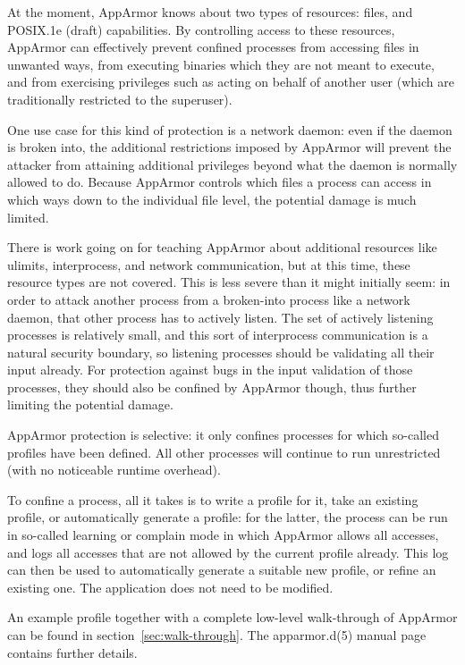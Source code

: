 \documentclass[a4paper]{article}
\begin{document}
At the moment, AppArmor knows about two types of resources: files, and
POSIX.1e (draft) capabilities.  By controlling access to these
resources, AppArmor can effectively prevent confined processes from
accessing files in unwanted ways, from executing binaries which they are
not meant to execute, and from exercising privileges such as acting on
behalf of another user (which are traditionally restricted to the
superuser).

One use case for this kind of protection is a network daemon: even if
the daemon is broken into, the additional restrictions imposed by
AppArmor will prevent the attacker from attaining additional privileges
beyond what the daemon is normally allowed to do.  Because AppArmor
controls which files a process can access in which ways down to the
individual file level, the potential damage is much limited.

There is work going on for teaching AppArmor about additional resources
like ulimits, interprocess, and network communication, but at this time,
these resource types are not covered.  This is less severe than it might
initially seem: in order to attack another process from a broken-into
process like a network daemon, that other process has to actively
listen.  The set of actively listening processes is relatively small,
and this sort of interprocess communication is a natural security
boundary, so listening processes should be validating all their input
already.  For protection against bugs in the input validation of those
processes, they should also be confined by AppArmor though, thus further
limiting the potential damage.

AppArmor protection is selective: it only confines processes for which
so-called profiles have been defined.  All other processes will continue
to run unrestricted (with no noticeable runtime overhead).

To confine a process, all it takes is to write a profile for it, take an
existing profile, or automatically generate a profile: for the latter,
the process can be run in so-called learning or complain mode in which
AppArmor allows all accesses, and logs all accesses that are not allowed
by the current profile already. This log can then be used to
automatically generate a suitable new profile, or refine an existing one.
The application does not need to be modified.

An example profile together with a complete low-level walk-through of
AppArmor can be found in section~\ref{sec:walk-through}.  The
apparmor.d(5) manual page contains further details.
\end{document}
